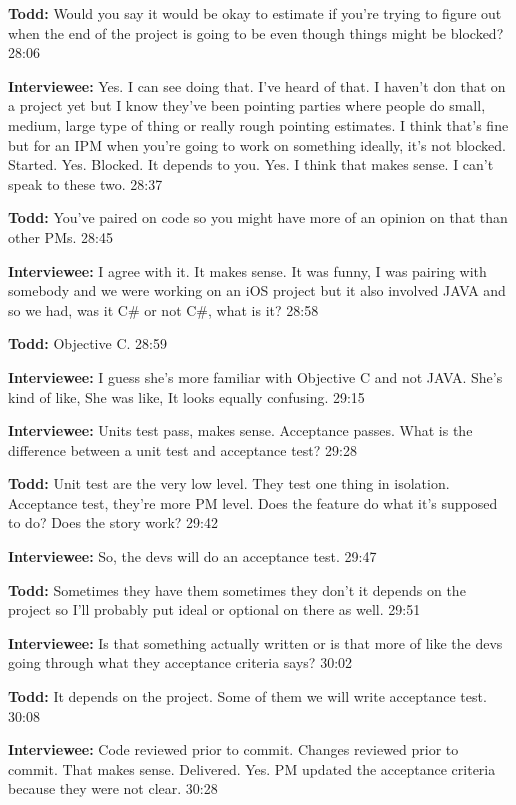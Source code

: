 \textbf{Todd:} Would you say it would be okay to estimate if you're trying to figure out when the end of the project is going to be even though things might be blocked? 28:06

\textbf{Interviewee:} Yes. I can see doing that. I've heard of that. I haven't don that on a project yet but I know they've been pointing  parties where people do small, medium, large type of thing or really rough pointing estimates. I think that's fine but for an IPM when you're going to work on something ideally, it's not blocked. Started. Yes. Blocked. It depends to you. Yes. I think that makes sense. I can't speak to these two. 28:37

\textbf{Todd:} You've paired on code so you might have more of an opinion on that than other PMs. 28:45

\textbf{Interviewee:} I agree with it. It makes sense. It was funny, I was pairing with somebody and we were working on an iOS project but it also involved JAVA and so we had, was it C\# or not C\#, what is it? 28:58

\textbf{Todd:} Objective C. 28:59

\textbf{Interviewee:} I guess she's more familiar with Objective C and not JAVA. She's kind of like,  She was like,  It looks equally confusing. 29:15

\textbf{Interviewee:} Units test pass, makes sense. Acceptance passes. What is the difference between a unit test and acceptance test? 29:28

\textbf{Todd:} Unit test are the very low level. They test one thing in isolation. Acceptance test, they're more PM level. Does the feature do what it's supposed to do? Does the story work? 29:42

\textbf{Interviewee:} So, the devs will do an acceptance test. 29:47

\textbf{Todd:} Sometimes they have them sometimes they don't it depends on the project so I'll probably put ideal or optional on there as well. 29:51

\textbf{Interviewee:} Is that something actually written or is that more of like the devs going through what they acceptance criteria says? 30:02

\textbf{Todd:} It depends on the project. Some of them we will write acceptance test. 30:08

\textbf{Interviewee:} Code reviewed prior to commit. Changes reviewed prior to commit. That makes sense. Delivered. Yes. PM updated the acceptance criteria because they were not clear. 30:28

